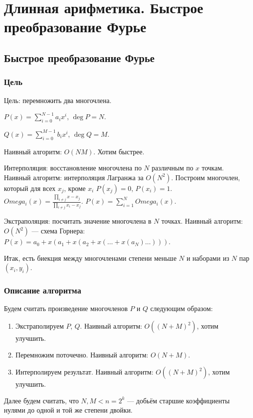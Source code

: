 \chapter{Длинная арифметика. Быстрое преобразование Фурье}

\section{Быстрое преобразование Фурье}

\subsection{Цель}

Цель: перемножить два многочлена.

$P(x)=\sum_{i=0}^{N-1}a_ix^i$, $\deg P=N$.

$Q(x)=\sum_{i=0}^{M-1}b_ix^i$, $\deg Q=M$.

Наивный алгоритм: $O(NM)$. Хотим быстрее.

Интерполяция: восстановление многочлена по $N$ различным по $x$ точкам.
Наивный алгоритм: интерполяция Лагранжа за $O(N^2)$.
Построим многочлен, который для всех $x_j$, кроме $x_i$ $P(x_j)=0$, $P(x_i)=1$.
$Omega_i(x)=\frac{\prod_{i\neq j}{x-x_j}}{\prod_{i\neq j}{x_i-x_j}}$.
$P(x)=\sum_{i=1}^{N}{Omega_i(x)}$.

Экстраполяция: посчитать значение многочлена в $N$ точках.
Наивный алгоритм: $O(N^2)$ --- схема Горнера: $P(x)=a_0+x(a_1+x(a_2+x(\dots+x(a_N)\dots)))$.

Итак, есть биекция между многочленами степени меньше $N$ и наборами из $N$ пар $(x_i,y_i)$.


\subsection{Описание алгоритма}

Будем считать произведение многочленов $P$ и $Q$ следующим образом:
\begin{enumerate}
\item Экстраполируем $P$, $Q$. Наивный алгоритм: $O((N+M)^2)$, хотим улучшить.
\item Перемножим поточечно. Наивный алгоритм: $O(N+M)$.
\item Интерполируем результат. Наивный алгоритм: $O((N+M)^2)$, хотим улучшить.
\end{enumerate}

Далее будем считать, что $N,M<n=2^k$ --- добьём старшие коэффициенты нулями до одной и той же степени двойки.

